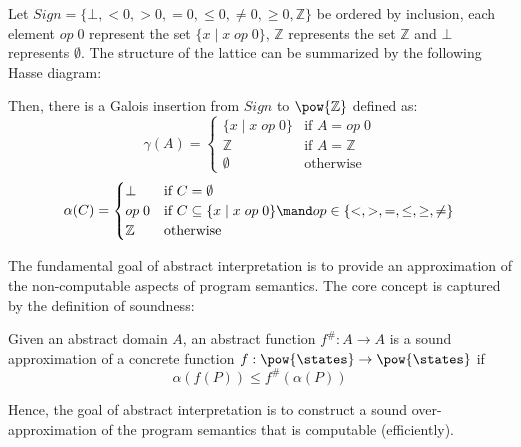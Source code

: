 \begin{example}
  \label{exmp:sign}
  Let $Sign = \{ \bot , <0, >0, =0, \leq 0, \neq 0, \geq 0, \mathbb{Z}\}$ be 
  ordered by inclusion, each element $op\; 0$ represent the set $\{ x \mid x 
  \; op \; 0 \}$, $\mathbb{Z}$ represents the set $\mathbb{Z}$ and $\bot$
  represents $\emptyset$. 
  The structure of the lattice can be summarized by the following Hasse diagram:

  \begin{center}
  \end{center}

  Then, there is a Galois insertion from $Sign$ to $\pow{\mathbb{Z}}$ defined as:
  $$\gamma(A) = \begin{cases}
    \{ x \mid x \;op\; 0 \} & \text{if } A = op\;0 \\
    \mathbb{Z}              & \text{if } A = \mathbb{Z} \\
    \emptyset & \text{otherwise}
  \end{cases}$$
  $$\alpha(C) = \begin{cases}
    \bot & \text{if } C = \emptyset \\
    op \; 0 & \text{if } C \subseteq \{ x \mid x \; op \; 0 \}
        \mand op \in \{<, >, =, \leq, \geq, \neq \} \\
    \mathbb{Z} & \text{otherwise}
  \end{cases}$$
\end{example}

The fundamental goal of abstract interpretation is to provide an approximation 
of the non-computable aspects of program semantics. The core concept is captured 
by the definition of soundness:

\begin{definition}[Soundness]
  Given an abstract domain $A$, an abstract function $f^\# : A \to A$ is a 
  sound approximation of a concrete function $f : \pow{\states} \to 
  \pow{\states}$ if
  $$\alpha(f(P)) \leq f^\#(\alpha(P))$$
\end{definition}

Hence, the goal of abstract interpretation is to construct a sound 
over-approximation of the program semantics that is computable (efficiently).
